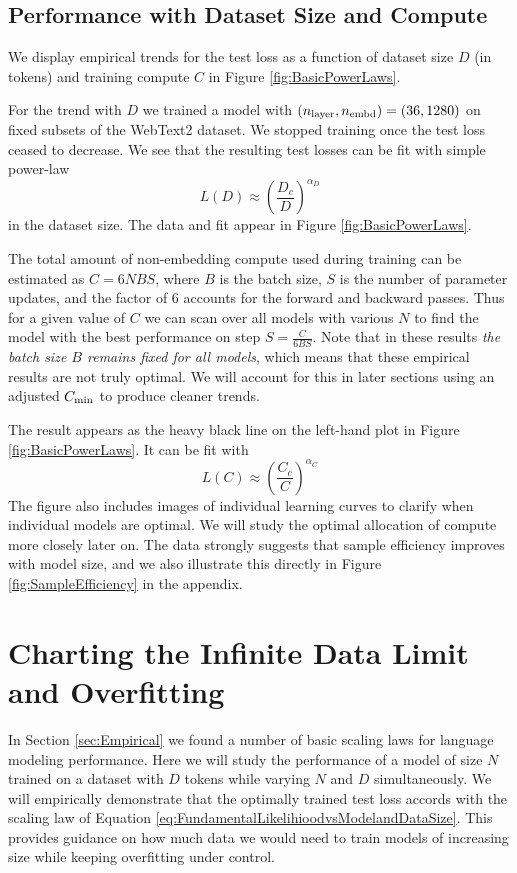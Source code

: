 \documentclass[english]{article}
\newcommand{\be}{\begin{equation}}
\newcommand{\ee}{\end{equation}}
\begin{document}
\subsection{Performance with Dataset Size and Compute}

We display empirical trends for the test loss as a function of dataset size $D$ (in tokens) and training compute $C$ in Figure \ref{fig:BasicPowerLaws}.    

For the trend with $D$ we trained a model with $(n_{\rm layer}, n_{\rm embd}) = (36, 1280)$ on fixed subsets of the WebText2 dataset.  We stopped training once the test loss ceased to decrease.  We see that the resulting test losses can be fit with simple power-law
\be
L(D) \approx \left( \frac{D_c}{D} \right)^{\alpha_D}
\ee
in the dataset size.  The data and fit appear in Figure \ref{fig:BasicPowerLaws}.

The total amount of non-embedding compute used during training can be estimated as $C = 6 N B S$, where $B$ is the batch size, $S$ is the number of parameter updates, and the factor of $6$ accounts for the forward and backward passes.  Thus for a given value of $C$ we can scan over all models with various $N$ to find the model with the best performance on step $S = \frac{C}{6 B S}$.  Note that in these results \emph{the batch size $B$ remains fixed for all models}, which means that these empirical results are not truly optimal.  We will account for this in later sections using an adjusted $C_{\rm min}$ to produce cleaner trends.

The result appears as the heavy black line on the left-hand plot in Figure \ref{fig:BasicPowerLaws}.  It can  be fit with 
\be
L(C) \approx \left( \frac{C_c}{C} \right)^{\alpha_C}
\ee
The figure also includes images of individual learning curves to clarify when individual models are optimal.  We will study the optimal allocation of compute more closely later on.
The data strongly suggests that sample efficiency improves with model size, and we also illustrate this directly in Figure \ref{fig:SampleEfficiency} in the appendix.  


\section{Charting the Infinite Data Limit and Overfitting}
\label{sec:ChartingOverfitting}

In Section \ref{sec:Empirical} we found a number of basic  scaling laws for language modeling performance.  Here we will study the performance of a model of size $N$ trained on a dataset with $D$ tokens while varying $N$ and $D$ simultaneously.  We will empirically demonstrate that the optimally trained test loss accords with the scaling law of Equation \eqref{eq:FundamentalLikelihioodvsModelandDataSize}.  This  provides guidance on how much data we would need to train models of increasing size while keeping overfitting under control.
\end{document}
